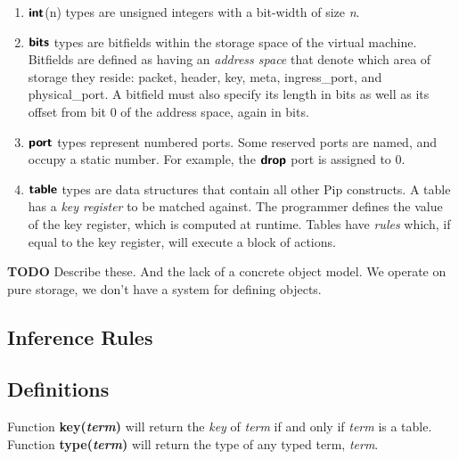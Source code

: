 \begin{enumerate}
\item $\bm{\mathsf{{int}}}$(n) types are unsigned integers with a bit-width of size \textit{n}.
\item $\bm{\mathsf{{bits}}}$ types are bitfields within the storage space of the virtual machine. Bitfields are defined as having an \textit{address space} that denote which area of storage they reside: packet, header, key, meta, ingress\_port, and physical\_port. A bitfield must also specify its length in bits as well as its offset from bit 0 of the address space, again in bits.
\item $\bm{\mathsf{{port}}}$ types represent numbered ports. Some reserved ports are named, and occupy a static number. For example, the $\bm{\mathsf{{drop}}}$ port is assigned to 0.
\item $\bm{\mathsf{{table}}}$ types are data structures that contain all other Pip constructs. A table has a \textit{key register} to be matched against. The programmer defines the value of the key register, which is computed at runtime. Tables have \textit{rules} which, if equal to the key register, will execute a block of actions.
\end{enumerate}

\textbf{TODO} Describe these. And the lack of a concrete object model. We
operate on pure storage, we don't have a system for defining objects.

\subsection{Inference Rules}
\subsection*{Definitions}
Function \textbf{key(\textit{term})} will return the \textit{key} of \textit{term} if and only if \textit{term} is a table. \newline
Function \textbf{type(\textit{term})} will return the type of any typed term, \textit{term}.

